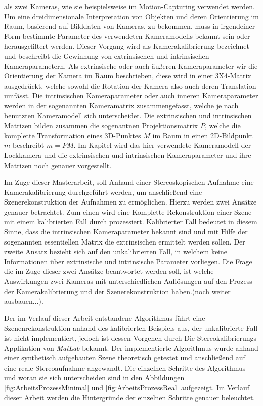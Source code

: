 als zwei Kameras, wie sie beispielsweise im Motion-Capturing verwendet werden. Um eine dreidimensionale Interpretation von Objekten und deren Orientierung im Raum, basierend auf Bilddaten von Kameras, zu bekommen, muss in irgendeiner Form bestimmte Parameter des verwendeten Kameramodells bekannt sein oder herausgefiltert werden. Dieser Vorgang wird als Kamerakalibrierung bezeichnet und beschreibt die Gewinnung von extrinsischen und intrinsischen Kameraparametern\cite{HZ,Ferid,Elements,ZZGXr}. Als extrinsische oder auch äußeren Kameraparameter wir die Orientierung der Kamera im Raum beschrieben, diese wird in einer 3X4-Matrix ausgedrückt, welche sowohl die Rotation der Kamera also auch deren Translation umfässt. Die intrinsischen Kameraparameter oder auch inneren Kameraparameter werden in der sogenannten Kameramatrix zusammengefasst, welche je nach benutzten Kameramodell sich unterscheidet. Die extrinsischen  und intrinsischen Matrizen bilden zusammen die sogenantnen Projektionsmatrix $P$, welche die komplette Transformation eines 3D-Punktes $M$ im Raum in einen 2D-Bildpunkt $m$ beschreibt $m = PM$. Im Kapitel  wird das hier verwendete Kameramodell der Lockkamera und die extrinsischen und intrinsischen Kameraparameter und ihre Matrizen noch genauer vorgestellt. 

Im Zuge dieser Masterarbeit, soll Anhand einer Stereoskopischen Aufnahme eine Kamerakalibrierung durchgeführt werden, um anschließend eine Szenerekonstruktion der Aufnahmen zu ermöglichen. Hierzu werden zwei Ansätze genauer betrachtet. Zum einen wird eine Komplette Rekonstruktion einer Szene mit einem kalibrierten Fall durch prozessiert. Kalibrierter Fall bedeutet in diesem Sinne, dass die intrinsischen Kameraparameter bekannt sind und mit Hilfe der sogenannten essentiellen Matrix die extrinsischen ermittelt werden sollen. Der zweite Ansatz bezieht sich auf den unkalibrierten Fall, in welchem keine Informationen über extrinsische und intrinsische Parameter vorliegen. Die Frage die im Zuge dieser zwei Ansätze beantwortet werden soll, ist welche Auswirkungen zwei Kameras mit unterschiedlichen Auflösungen auf den Prozess der Kamerakalibrierung und der Szenerekonstruktion haben.(noch weiter ausbauen...).

 Der im Verlauf dieser Arbeit entstandene Algorithmus führt eine Szenenrekonstruktion anhand des kalibrierten Beispiels aus, der unkalibrierte Fall ist nicht implementiert, jedoch ist dessen Vorgehen durch Die Stereokalibrierungs Applikation von \textit{MatLab}\cite{MatlabStereoApp} bekannt. Der implementierte Algorithmus wurde anhand einer synthetisch aufgebauten Szene theoretisch getestet und anschließend auf eine reale Stereoaufnahme angewandt. Die einzelnen Schritte des Algorithmus und woran sie sich unterscheiden sind in den Abbildungen \ref{fig:ArbeitsProzessMinimal} und \ref{fig:ArbeitsProzessReal} aufgezeigt. Im Verlauf dieser Arbeit werden die Hintergründe der einzelnen Schritte genauer beleuchtet.


